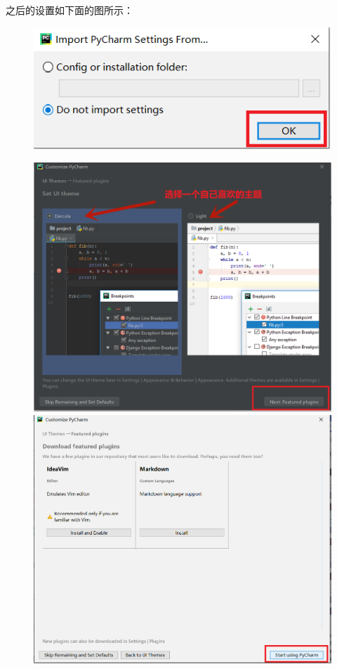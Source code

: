 之后的设置如下面的图所示：

\begin{figure}[!ht]
  \centering
  \includegraphics[scale=0.8]{figure/chapter1/pycharm10.png}
\end{figure}

\begin{figure}[!ht]
  \centering
  \includegraphics[scale=0.3]{figure/chapter1/pycharm11.png}\quad
  \includegraphics[scale=0.3]{figure/chapter1/pycharm12.png}
\end{figure}

